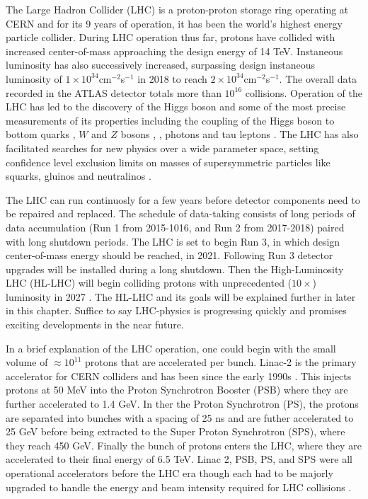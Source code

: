  
The Large Hadron Collider (LHC) is a proton-proton storage ring operating at CERN and for its 9 years of operation, it has been the world's highest energy particle collider. 
During LHC operation thus far, protons have collided with increased center-of-mass approaching the design energy of 14 TeV. Instaneous luminosity has also successively increased, surpassing design instaneous luminosity of $1\times10^{34}$cm$^{-2}$s$^{-1}$ in 2018 to reach $2\times10^{34}$cm$^{-2}$s$^{-1}$\cite{CERNnews1}. The overall data recorded in the ATLAS detector totals more than $10^{16}$ collisions. Operation of the LHC has led to the discovery of the Higgs boson and some of the most precise measurements of its properties including the coupling of the Higgs boson to bottom quarks \cite{Aaboud_2018_0}, $W$ and $Z$ bosons \cite{Aaboud_2019}, \cite{Aaboud_2018}, photons\cite{Aaboud_2018_2} and tau leptons \cite{Aaboud_2019_2}. The LHC has also facilitated searches for new physics over a wide parameter space, setting confidence level exclusion limits on masses of supersymmetric particles like squarks, gluinos and neutralinos \cite{ATLAS-CONF-2019-040}. 

The LHC can run continuosly for a few years before detector components need to be repaired and replaced. The schedule of data-taking consists of long periods of data accumulation (Run 1 from 2015-1016, and Run 2 from 2017-2018) paired with long shutdown periods. The LHC is set to begin Run 3, in which design center-of-mass energy should be reached, in 2021. Following Run 3 detector upgrades will be installed during a long shutdown. Then the High-Luminosity LHC (HL-LHC) will begin colliding protons with unprecedented ($10\times$) luminosity in 2027 \cite{CERNnews2}. The HL-LHC and its goals will be explained further in later in this chapter. Suffice to say LHC-physics is progressing quickly and promises exciting developments in the near future. 

In a brief explanation of the LHC operation, one could begin with the small volume of $\approx 10^{11}$ protons that are accelerated per bunch. Linac-2 is the primary accelerator for CERN colliders and has been since the early 1990s \cite{LHCInjector}. This injects protons at 50 MeV into the Proton Synchrotron Booster (PSB) where they are further accelerated to 1.4 GeV. In ther the Proton Synchrotron (PS), the protons are separated into bunches with a spacing of 25 ns and are futher accelerated to 25 GeV before being extracted to the Super Proton Synchrotron (SPS), where they reach 450 GeV. Finally the bunch of protons enters the LHC, where they are accelerated to their final energy of 6.5 TeV. Linac 2, PSB, PS, and SPS were all operational accelerators before the LHC era though each had to be majorly upgraded to handle the energy and beam intensity required for LHC collisions \cite{LHCInjector}. 

